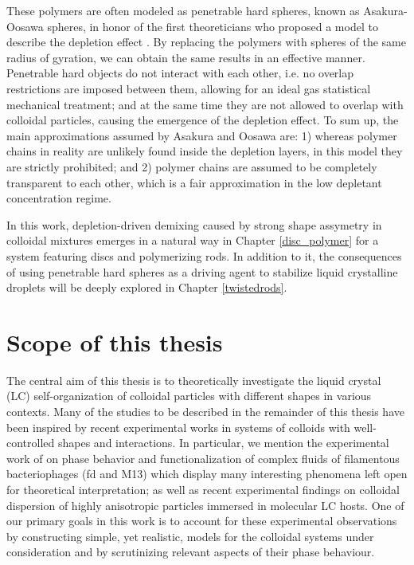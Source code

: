 These polymers are often modeled as penetrable hard spheres, known as Asakura-Oosawa spheres, in honor of the first theoreticians who proposed a model to describe the depletion effect \cite{ASAKURA54,ASAKURA58,Vrijdepletie}. By replacing the polymers with spheres of the same radius of gyration, we can obtain the same results in an effective manner. Penetrable hard objects do not interact with each other, i.e. no overlap restrictions are imposed between them, allowing for an ideal gas statistical mechanical treatment; and at the same time they are not allowed to overlap with colloidal particles, causing the emergence of the depletion effect. To sum up, the main approximations assumed by Asakura and Oosawa are: 1) whereas polymer chains in reality are unlikely found inside the depletion layers, in this model they are strictly prohibited; and 2) polymer chains are assumed to be completely transparent to each other, which is a fair approximation in the low depletant concentration regime.

In this work, depletion-driven demixing caused by strong shape assymetry in colloidal mixtures emerges in a natural way in Chapter \ref{disc_polymer} for a system featuring discs and polymerizing rods. In addition to it, the consequences of using penetrable hard spheres as a driving agent to stabilize liquid crystalline droplets will be deeply explored in Chapter \ref{twistedrods}.

\section{Scope of this thesis}

The central aim of this thesis is to theoretically investigate the liquid crystal (LC) self-organization of colloidal particles with different shapes in various contexts. Many of the studies to be described in the remainder of this thesis have been inspired by recent experimental works in systems of colloids with well-controlled shapes and interactions. In particular, we mention the experimental work of \cite{Grelet2014} on phase behavior and functionalization of complex fluids of filamentous bacteriophages (fd and M13) which display many interesting phenomena left open for theoretical interpretation; as well as recent experimental findings \cite{senyuk2021nematoelasticity,mundoor2021} on colloidal dispersion of highly anisotropic particles immersed in molecular LC hosts. One of our primary goals in this work is to account for these experimental observations by constructing simple, yet realistic,  models for the colloidal systems under consideration and by scrutinizing relevant aspects of their phase behaviour.


